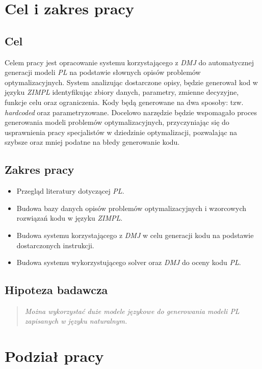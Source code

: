 \section{Cel i zakres pracy}

\subsection{Cel}
Celem pracy jest opracowanie systemu korzystającego z \textit{DMJ} do automatycznej generacji modeli \textit{PL} na podstawie słownych opisów problemów optymalizacyjnych. System analizując dostarczone opisy, będzie generował kod w języku \textit{ZIMPL} identyfikując zbiory danych, parametry, zmienne decyzyjne, funkcje celu oraz ograniczenia. Kody będą generowane na dwa sposoby: tzw. \textit{hardcoded} oraz parametryzowane. Docelowo narzędzie będzie wspomagało proces generowania modeli problemów optymalizacyjnych, przyczyniając się do usprawnienia pracy specjalistów w dziedzinie optymalizacji, pozwalając na szybsze oraz mniej podatne na błedy generowanie kodu.

\subsection{Zakres pracy}
\begin{itemize}
    \item Przegląd literatury dotyczącej \textit{PL}.
    \item Budowa bazy danych opisów problemów optymalizacyjnych i wzorcowych rozwiązań kodu w języku \textit{ZIMPL}.
    \item Budowa systemu korzystającego z \textit{DMJ} w celu generacji kodu na podstawie dostarczonych instrukcji.
    \item Budowa systemu wykorzystującego solver oraz \textit{DMJ} do oceny kodu \textit{PL}.
\end{itemize}

\subsection{Hipoteza badawcza} 
\begin{quote}
\textit{Można wykorzystać duże modele językowe do generowania modeli PL zapisanych w języku naturalnym.}
\end{quote}

\section{Podział pracy}

